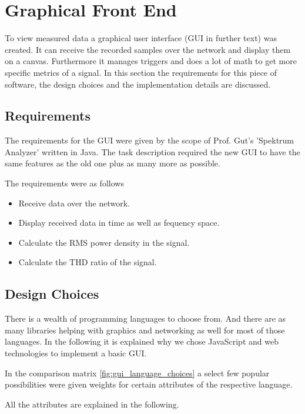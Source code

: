\chapter{Graphical Front End} %
\label{ch:graphical_front_end}


To view measured data a graphical user interface (GUI in further text) was created. It can receive the recorded samples over the network and display them on a canvas. Furthermore it manages triggers and does a lot of math to get more specific metrics of a signal.
In this section the requirements for this piece of software, the design choices and the implementation details are discussed.

\section{Requirements}

The requirements for the GUI were given by the scope of Prof. Gut's 'Spektrum Analyzer' written in Java.
The task description required the new GUI to have the same features as the old one plus as many more as possible.

The requirements were as follows

\begin{itemize}
    \item Receive data over the network.
    \item Display received data in time as well as fequency space.
    \item Calculate the RMS power density in the signal.
    \item Calculate the THD ratio of the signal.
\end{itemize}

\section{Design Choices}

There is a wealth of programming languages to choose from. And there are as many libraries helping with graphics and networking as well for most of those languages.
In the following it is explained why we chose JavaScript and web technologies to implement a basic GUI.

In the comparison matrix \ref{fig:gui_language_choices} a select few popular possibilities were given weights for certain attributes of the respective language.

All the attributes are explained in the following.

